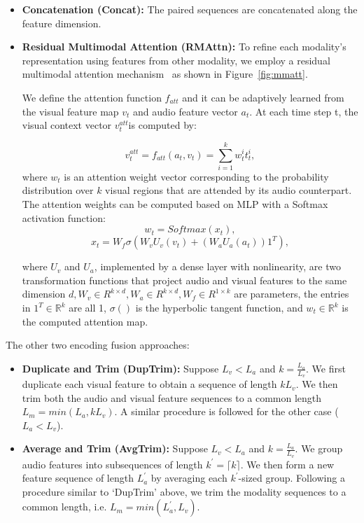 \documentclass[10pt,twocolumn,letterpaper]{article}
\begin{document}
\begin{itemize}
\item \textbf{Concatenation (Concat):} The paired sequences are concatenated along the feature dimension.

\item \textbf{Residual Multimodal Attention (RMAttn):}  To refine each modality's representation using features from other modality, we employ a residual multimodal attention mechanism~\cite{tian2018audiovisual} as shown in Figure~\ref{fig:mmatt}. 

We define the attention function $f_{att}$ and it can be adaptively learned from the visual feature map $v_t$ and audio feature vector $a_t$. At each time step t, the visual context vector $v_t^{att}$is computed by:

\begin{equation}
v_t^{att} = f_{att}(a_t, v_t) = \sum_{i=1}^{k} w_t^it_t^i ,
\end{equation}
where $w_t$ is an attention weight vector corresponding to the probability distribution over $k$ visual regions that are attended by its audio counterpart. The
attention weights can be computed based on MLP with a Softmax activation
function:
\begin{equation}
    w_t = Softmax(x_t) ,
\end{equation}
\begin{equation}    
x_t = W_f\sigma(W_vU_v(v_t) + (W_aU_a(a_t)){1}^T) ,
\end{equation}
 
 
 
where $U_v$ and $U_a$, implemented by a dense layer with nonlinearity, are two transformation functions that project audio and visual features to the same dimension
$d, W_v \in R^{k\times d}, W_a \in R^{k\times d}, W_f \in R^{1\times k}$ are parameters, the entries in ${1}^T \in \mathbb{R}^k$ are all 1, $\sigma()$ is the hyperbolic tangent function, and $w_t \in \mathbb{R}^k$
is the computed attention map. 
\end{itemize}



The other two encoding fusion approaches:
\begin{itemize}
    
\item \textbf{Duplicate and Trim (DupTrim):} Suppose $L_v < L_a$ and $k=\frac{L_a}{L_v}$. We first duplicate each visual feature to obtain a sequence of length $k L_v$. We then trim both the audio and visual feature sequences to a common length $L_m = min(L_a,k L_v)$. A similar procedure is followed for the other case ($L_a < L_v$).  

\item \textbf{Average and Trim (AvgTrim):} Suppose $L_v < L_a$ and $k=\frac{L_a}{L_v}$. We group audio features into subsequences of length $k^{'} = \lceil k \rceil$. We then form a new feature sequence of length $L_a^{'}$ by averaging each $k^{'}$-sized group. Following a procedure similar to `DupTrim' above, we trim the modality sequences to a common length, i.e. $L_m = min(L_a^{'},L_v)$. 

\end{itemize}
\end{document}
